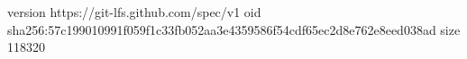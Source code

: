 version https://git-lfs.github.com/spec/v1
oid sha256:57c199010991f059f1c33fb052aa3e4359586f54cdf65ec2d8e762e8eed038ad
size 118320
